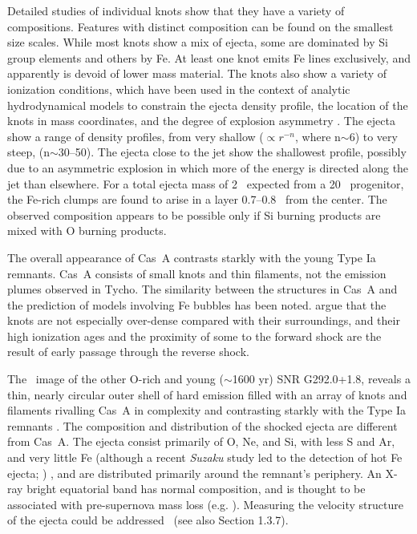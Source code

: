 \documentclass[11pt,a4paper]{article}
\begin{document}
{Detailed studies of individual knots show that they have a variety of
compositions.  Features with distinct composition can be found on the
smallest size scales. While most knots show a mix of ejecta, some are
dominated by Si group elements and others by Fe. At least one knot
emits Fe lines exclusively, and apparently is devoid of lower mass
material. The knots also show a variety of ionization conditions,
which have been used in the context of analytic hydrodynamical models
to constrain the ejecta density profile, the location of the knots in
mass coordinates, and the degree of explosion asymmetry
\citep{laming03, hwang03}.  The ejecta show a range of density
profiles, from very shallow ($\propto r^{−n}$, where n$\sim$6) to
very steep, (n$\sim$30--50). The ejecta close to the jet show the
shallowest profile, possibly due to an asymmetric explosion in which
more of the energy is directed along the jet than elsewhere. For a
total ejecta mass of 2 \msun\ expected from a 20 \msun\
progenitor, the Fe-rich clumps are found to arise in a layer 0.7--0.8
\msun\ from the center. The observed composition appears to be
possible only if Si burning products are mixed with O burning
products.

The overall appearance of Cas~A contrasts starkly with the young Type
Ia remnants. Cas~A consists of small knots and thin filaments, not the
emission plumes observed in Tycho. The similarity between the
structures in Cas~A and the prediction of models involving Fe bubbles
has been noted. \citet{laming03} argue that the knots are not
especially over-dense compared with their surroundings, and their high
ionization ages and the proximity of some to the forward shock are the
result of early passage through the reverse shock.

The \chandra\ image of the other O-rich and young ($\sim$1600 yr) SNR G292.0+1.8, reveals
a thin, nearly circular outer shell of hard emission filled with an
array of knots and filaments rivalling Cas~A in complexity and
contrasting starkly with the Type Ia remnants \citep{hughes01, park02, gonzalez03}. The
composition and distribution of the shocked ejecta are different from
Cas~A. The ejecta consist primarily of O, Ne, and Si, with less S and
Ar, and very little Fe (although a recent {\it Suzaku} study led to the detection
of hot Fe ejecta; \citealt{kamitsukasa14}) , and are distributed primarily around the
remnant's periphery. An X-ray bright equatorial band has normal
composition, and is thought to be associated with pre-supernova mass
loss (e.g. \citealt{park07}). Measuring the velocity structure of the ejecta could be addressed \ah\
(see also Section 1.3.7).

}
\end{document}
